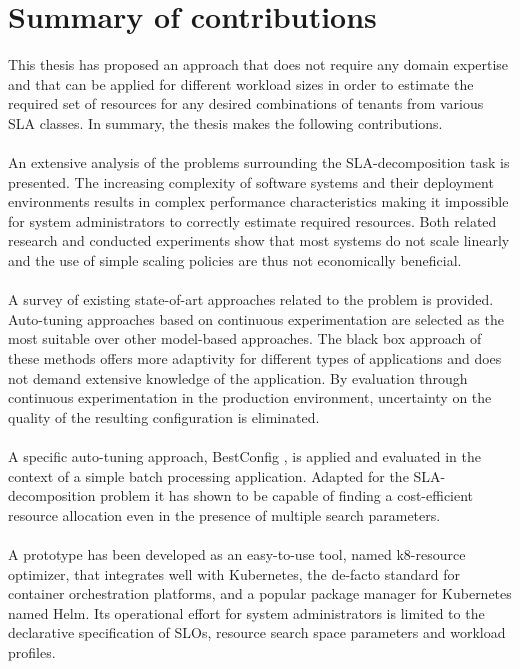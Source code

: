 \section{Summary of contributions}
This thesis has proposed an approach that does not require any domain expertise and that can be applied for different workload sizes in order to estimate the required set of resources for any desired combinations of tenants from various SLA classes. In summary, the thesis makes the following contributions.\\\\
An extensive analysis of the problems surrounding the SLA-decomposition task is presented. The increasing complexity of software systems and their deployment environments results in complex performance characteristics making it impossible for system administrators to correctly estimate required resources. Both related research and conducted experiments show that most systems do not scale linearly and the use of simple scaling policies are thus not economically beneficial.
\\\\
A survey of existing state-of-art approaches related to the problem is provided. Auto-tuning approaches based on continuous experimentation are selected as the most suitable over other model-based approaches. The black box approach of these methods offers more adaptivity for different types of applications and does not demand extensive knowledge of the application. By evaluation through continuous experimentation in the production environment, uncertainty on the quality of the resulting configuration is eliminated. 
\\\\
A specific auto-tuning approach, BestConfig \cite{zhu2017bestconfig}, is applied and evaluated in the context of a simple batch processing application. Adapted for the SLA-decomposition problem it has shown to be capable of finding a cost-efficient resource allocation even in the presence of multiple search parameters. 
\\\\
A prototype has been developed as an easy-to-use tool, named k8-resource optimizer, that integrates well with Kubernetes, the de-facto standard for container orchestration platforms, and a popular package manager for Kubernetes named Helm. Its operational effort for system administrators is limited to the declarative specification of  SLOs, resource search space parameters and workload profiles.
